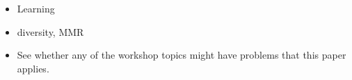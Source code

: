 
\begin{itemize}
	\item Learning
	\item diversity, MMR
	\item See whether any of the workshop topics might have problems that this paper applies.
\end{itemize}
